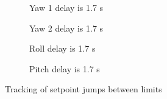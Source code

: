 %




\begin{figure}[H]
	\begin{subfigure}[b]{0.5\textwidth}
		\centering
		\resizebox{\linewidth}{!}{
			
		}
		\caption{Yaw 1 delay is 1.7 s}
	\end{subfigure}
	\begin{subfigure}[b]{0.5\textwidth}
		\centering
		\resizebox{\linewidth}{!}{
			
		}
		\caption{Yaw 2 delay is 1.7 s}
	\end{subfigure}
	\begin{subfigure}[b]{0.5\textwidth}
		\centering
		\resizebox{\linewidth}{!}{
			
		}
		\caption{Roll delay is 1.7 s}
	\end{subfigure}
	\begin{subfigure}[b]{0.5\textwidth}
		\centering
		\resizebox{\linewidth}{!}{
			
		}
		\caption{Pitch delay is 1.7 s}
	\end{subfigure}
	\caption{Tracking of setpoint jumps between limits}
	\label{square_excite}
\end{figure}

